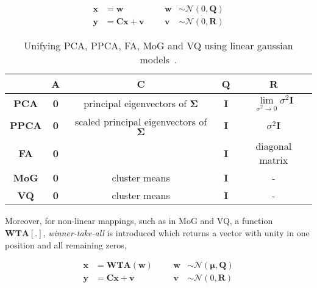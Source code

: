 \begin{equation}
\begin{array}{llllllllllllll}
\mathbf{x} &= \mathbf{w} 											& & & \mathbf{w} &\sim \mathcal{N}(0, \mathbf{Q})\\
\mathbf{y} &=  \mathbf{C}\mathbf{x} +  \mathbf{v} 		& & & \mathbf{v} & \sim \mathcal{N}(0, \mathbf{R})
\end{array}
\label{LGM1}
\end{equation}



\begin{table}[t]
\centering
\begin{tabular}{| c | c | c | c | c |}\hline
 				 	&\textbf{A}	 	&	\textbf{C}  									& \textbf{Q} 	&  \textbf{R}                                                                		\\\hline
\textbf{PCA} 	&\textbf{0}		&	principal eigenvectors of $\boldsymbol\Sigma$	& \textbf{I}  	&  $\lim\limits_{\sigma^2 \rightarrow 0} \sigma^2\mathbf{I}$ 	\\\hline
\textbf{PPCA} &\textbf{0}		& 	scaled principal eigenvectors of $\boldsymbol\Sigma$	& \textbf{I}	&										             $\sigma^2 \mathbf{I}$	 \\\hline
\textbf{FA}   	&\textbf{0}		&													& \textbf{I} 	&  diagonal matrix 																\\\hline
\textbf{MoG}	&\textbf{0}		&	cluster means								& \textbf{I}	& 	-																					\\\hline
\textbf{VQ}	 	&\textbf{0} 	&	cluster means								& \textbf{I}	& 	-																					\\\hline
\end{tabular}
\caption{Unifying PCA, PPCA, FA, MoG and VQ using linear gaussian models~\cite{1999_JNL_Gaussian_roweis, 1999_JNL_PPCA_Tipping}.}
\label{table:LGM_unifying}
\end{table}

Moreover, for non-linear mappings, such as in MoG and VQ, a function $\mathbf{WTA[.]}$, \emph{winner-take-all} is introduced which returns a vector with unity in one position and all remaining zeros,

\begin{equation}
\begin{array}{llllllllllllll}
\mathbf{x} &= \mathbf{WTA}(\mathbf{w}) 						& & & \mathbf{w} &\sim \mathcal{N}(\mathbf{\boldsymbol\mu}, \mathbf{Q})\\
\mathbf{y} &=  \mathbf{C}\mathbf{x} +  \mathbf{v} 		& & & \mathbf{v} & \sim \mathcal{N}(0, \mathbf{R})
\end{array}
\label{LGM2}
\end{equation}

